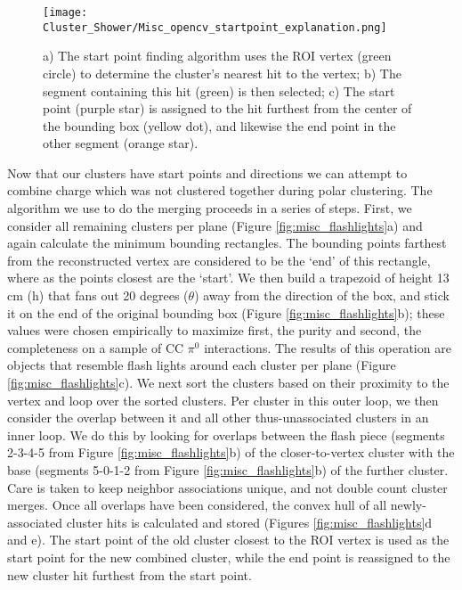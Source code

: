 \documentclass{article}
\begin{document}
\begin{figure}[h!]
\centering
\texttt{[image: Cluster\_Shower/Misc\_opencv\_startpoint\_explanation.png]}
\caption{ a) The start point finding algorithm uses the ROI vertex (green circle) to determine the
cluster’s nearest hit to the vertex; b) The segment containing this hit (green) is then selected; c) The
start point (purple star) is assigned to the hit furthest from the center of the bounding box (yellow
dot), and likewise the end point in the other segment (orange star). }
\label{fig:misc_opencv_startpoint}
\end{figure}

\par Now that our clusters have start points and directions we can attempt to combine charge which was not clustered together during polar clustering. The algorithm we use to do the merging proceeds in a series of steps.  First, we consider all remaining clusters per plane (Figure \ref{fig:misc_flashlights}a) and again calculate the minimum bounding rectangles. The bounding points farthest from the reconstructed vertex are considered to be the `end' of this rectangle, where as the points closest are the `start'.  We then build a trapezoid of height 13 cm (h) that fans out 20 degrees ($\theta$) away from the direction of the box, and stick it on the end of the original bounding box (Figure \ref{fig:misc_flashlights}b); these values were chosen empirically to maximize first, the purity and second, the completeness on a sample of CC $\pi^0$ interactions.  The results of this operation are objects that resemble flash lights around each cluster per plane (Figure \ref{fig:misc_flashlights}c). We next sort the clusters based on their proximity to the vertex and loop over the sorted clusters. Per cluster in this outer loop, we then consider the overlap between it and all other thus-unassociated clusters in an inner loop.  We do this by looking for overlaps between the flash piece (segments 2-3-4-5 from Figure \ref{fig:misc_flashlights}b) of the closer-to-vertex cluster with the base (segments 5-0-1-2 from Figure \ref{fig:misc_flashlights}b) of the further cluster. Care is taken to keep neighbor associations unique, and not double count cluster merges. Once all overlaps have been considered, the convex hull \cite{bib:convexHull} of all newly-associated cluster hits is calculated and stored (Figures \ref{fig:misc_flashlights}d and e). The start point of the old cluster closest to the ROI vertex is used as the start point for the new combined cluster, while the end point is reassigned to the new cluster hit furthest from the start point.
\end{document}
